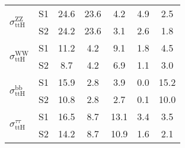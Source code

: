 \begin{tabular}{@{} l c c@{\hskip 0.15in} c c c c @{}}
\multirow{2}{*}{$\sigma_{\mathrm{ttH}}^{\mathrm{ZZ}}$} & S1  & 24.6& 23.6 & 4.2 & 4.9 & 2.5  \\[1pt]
                        & S2  & 24.2& 23.6 & 3.1 & 2.6 & 1.8  \\[4pt]
\multirow{2}{*}{$\sigma_{\mathrm{ttH}}^{\mathrm{WW}}$} & S1  & 11.2& 4.2 & 9.1 & 1.8 & 4.5  \\[1pt]
                        & S2  & 8.7& 4.2 & 6.9 & 1.1 & 3.0  \\[4pt]
\multirow{2}{*}{$\sigma_{\mathrm{ttH}}^{\mathrm{bb}}$} & S1  & 15.9& 2.8 & 3.9 & 0.0 & 15.2  \\[1pt]
                        & S2  & 10.8& 2.8 & 2.7 & 0.1 & 10.0  \\[4pt]
\multirow{2}{*}{$\sigma_{\mathrm{ttH}}^{\tau \tau }$} & S1  & 16.5& 8.7 & 13.1 & 3.4 & 3.5  \\[1pt]
                        & S2  & 14.2& 8.7 & 10.9 & 1.6 & 2.1  \\[4pt]
\hline
\end{tabular}